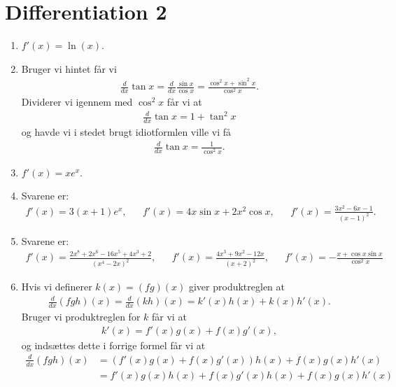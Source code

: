 \newpage
\section{Differentiation 2}
\begin{enumerate}
	\item $f'(x)=\ln(x)$.
	
	\item\label{it:diff21ans} Bruger vi hintet får vi
	\begin{align*}
	\frac{d}{dx} \tan x=\frac{d}{dx} \frac{\sin x}{\cos x}=\frac{\cos^2 x+\sin^2 x}{\cos^2 x}.
	\end{align*}
	Dividerer vi igennem med $ \cos^2 x $ får vi at 
	\begin{align*}
	\frac{d}{dx} \tan x= 1+\tan^2x
	\end{align*}
	og havde vi i stedet brugt idiotformlen ville vi få
	\begin{align*}
	\frac{d}{dx} \tan x= \frac{1}{\cos^2 x}.
	\end{align*}

	\item $f'(x)=xe^x$.
	
	\item Svarene er:
	\begin{align*}
	f'(x)=3(x+1)e^x,&& f'(x)=4x\sin x+2x^2\cos x,&& f'(x)=\frac{3x^2-6x-1}{(x-1)^2}.
	\end{align*}
	
	
	\item Svarene er:
	\begin{align*}
	f'(x)=\frac{2x^8+2x^6-16x^5+4x^3+2 }{(x^4-2x)^2},&& f'(x)=\frac{4x^3+9x^2-12x}{(x+2)^2},&& f'(x)=-\frac{x+\cos x\sin x}{\cos^2 x}
	\end{align*} 
	
	
	\item Hvis vi definerer $k(x)=(fg)(x)$ giver produktreglen at
	\begin{align*}
	\frac{d}{dx} (fgh)(x)=\frac{d}{dx} (kh)(x)=k'(x)h(x)+k(x)h'(x).
	\end{align*} 
	Bruger vi produktreglen for $k$ får vi at 
	\begin{align*}
	k'(x)=f'(x)g(x)+f(x)g'(x),
	\end{align*}
	og indsættes dette i forrige formel får vi at
	\begin{align*}
	\frac{d}{dx} (fgh)(x)&=(f'(x)g(x)+f(x)g'(x))h(x)+f(x)g(x)h'(x)\\
	&=f'(x)g(x)h(x)+f(x)g'(x)h(x)+f(x)g(x)h'(x)
	\end{align*}
	

\end{enumerate}
